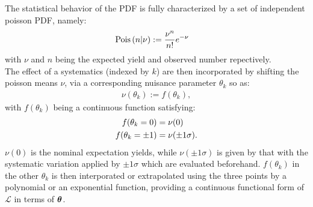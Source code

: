 The statistical behavior of the PDF is fully characterized by a set of independent poisson PDF, namely:
\begin{align}
\mathrm{Pois}\,(n|\nu) & := \frac{\nu^n}{n!} e^{-\nu} \nonumber
\end{align}
with $\nu$ and $n$ being the expected yield and observed number repectively. \\

The effect of a systematics (indexed by $k$) are then incorporated by shifting the poisson means $\nu$, via a corresponding nuisance parameter $\theta_k$ so as:
\begin{align}
        \nu(\theta_k) := f(\theta_k), 
\end{align}
with $f(\theta_k)$ being a continuous function satisfying:
\begin{align}
        f(\theta_k=0) & =  \nu(0)  \nonumber \\
        f(\theta_k=\pm1) & =  \nu(\pm1\sigma).
\end{align}
$\nu(0)$ is the nominal expectation yields, while $\nu(\pm1\sigma)$ is given by that with the systematic variation applied by $\pm1\sigma$ which are evaluated beforehand. $f(\theta_k)$ in the other $\theta_k$ is then interporated or extrapolated using the three points by a polynomial or an exponential function, providing a continuous functional form of $\mathcal{L}$ in terms of $\bm{\theta}$.


